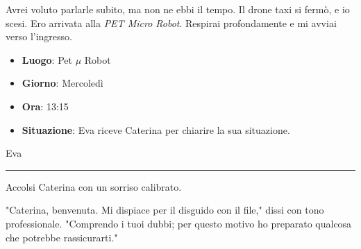 Avrei voluto parlarle subito, ma non ne ebbi il tempo. Il drone taxi si fermò, e io scesi. Ero arrivata alla \emph{PET Micro Robot}. Respirai profondamente e mi avviai verso l'ingresso.
\newpage
\begin{tcolorbox}[colback=gray!5,colframe=gray!80,title=\textbf{Scheda Informativa}]

    \begin{itemize}
        \item \textbf{Luogo}: Pet $\mu$ Robot
        \item \textbf{Giorno}: Mercoledì
        \item \textbf{Ora}: 13:15
        \item \textbf{Situazione}: Eva riceve Caterina per chiarire la sua situazione.
    \end{itemize}

\end{tcolorbox}
\vspace{1em}
\begin{center}Eva\end{center}
\hrule
\vspace{1em}
\begin{center}
\begin{minipage}{0.7\textwidth}
    \centering
    
\end{minipage}
\end{center}
Accolsi Caterina con un sorriso calibrato.
\begin{dialogue}
"Caterina, benvenuta. Mi dispiace per il disguido con il file," dissi con tono professionale. "Comprendo i tuoi dubbi; per questo motivo ho preparato qualcosa che potrebbe rassicurarti."
\end{dialogue}

